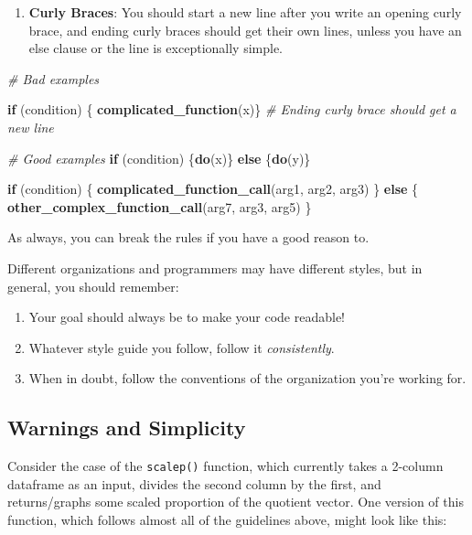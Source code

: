\documentclass[]{book}
\newenvironment{Shaded}{\begin{snugshade}}{\end{snugshade}}
\newcommand{\KeywordTok}[1]{\textcolor[rgb]{0.13,0.29,0.53}{\textbf{#1}}}
\newcommand{\CommentTok}[1]{\textcolor[rgb]{0.56,0.35,0.01}{\textit{#1}}}
\newcommand{\ControlFlowTok}[1]{\textcolor[rgb]{0.13,0.29,0.53}{\textbf{#1}}}
\newcommand{\NormalTok}[1]{#1}
\providecommand{\tightlist}{%
  \setlength{\itemsep}{0pt}\setlength{\parskip}{0pt}}
\begin{document}
\begin{enumerate}
\def\labelenumi{\arabic{enumi}.}
\setcounter{enumi}{2}
\tightlist
\item
  \textbf{Curly Braces}: You should start a new line after you write an
  opening curly brace, and ending curly braces should get their own
  lines, unless you have an else clause or the line is exceptionally
  simple.
\end{enumerate}

\begin{Shaded}
\begin{Highlighting}[]
\CommentTok{# Bad examples}

\ControlFlowTok{if}\NormalTok{ (condition) \{}
  \KeywordTok{complicated_function}\NormalTok{(x)\} }\CommentTok{# Ending curly brace should get a new line}

\CommentTok{# Good examples}
\ControlFlowTok{if}\NormalTok{ (condition) \{}\KeywordTok{do}\NormalTok{(x)\} }\ControlFlowTok{else}\NormalTok{ \{}\KeywordTok{do}\NormalTok{(y)\}}

\ControlFlowTok{if}\NormalTok{ (condition) \{}
  \KeywordTok{complicated_function_call}\NormalTok{(arg1, arg2, arg3)}
\NormalTok{\} }\ControlFlowTok{else}\NormalTok{ \{}
  \KeywordTok{other_complex_function_call}\NormalTok{(arg7, arg3, arg5)}
\NormalTok{\}}
\end{Highlighting}
\end{Shaded}

As always, you can break the rules if you have a good reason to.

Different organizations and programmers may have different styles, but
in general, you should remember:

\begin{enumerate}
\def\labelenumi{\arabic{enumi}.}
\tightlist
\item
  Your goal should always be to make your code readable!
\item
  Whatever style guide you follow, follow it \emph{consistently}.
\item
  When in doubt, follow the conventions of the organization you're
  working for.
\end{enumerate}

\subsection{Warnings and Simplicity}\label{warnings-and-simplicity}

Consider the case of the \texttt{scalep()} function, which currently
takes a 2-column dataframe as an input, divides the second column by the
first, and returns/graphs some scaled proportion of the quotient vector.
One version of this function, which follows almost all of the guidelines
above, might look like this:
\end{document}
